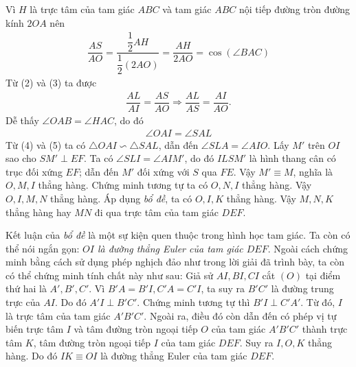 \begin{bt}
{\begin{center}
		\end{center}
		Vì $H$ là trực tâm của tam giác $ABC$ và tam giác $ABC$ nội tiếp đường tròn đường kính $2OA$ nên
		\begin{align*}
			\dfrac{AS}{AO}=\dfrac{\dfrac{1}{2}AH}{\dfrac{1}{2}(2AO)}=\dfrac{AH}{2AO}=\cos (\angle BAC)\tag{3}
		\end{align*}
		Từ (2) và (3) ta được
		\begin{align*}
			\dfrac{AL}{AI}=\dfrac{AS}{AO}\Rightarrow\dfrac{AL}{AS}=\dfrac{AI}{AO}.\tag{4}
		\end{align*}
		Dễ thấy $\angle OAB=\angle HAC$, do đó
		\begin{align*}
			\angle OAI=\angle SAL\tag{5}
		\end{align*}
		Từ (4) và (5) ta có $\triangle OAI\backsim \triangle SAL$, dẫn đến $\angle SLA=\angle AIO$.
		Lấy $M'$ trên $OI$ sao cho $SM'\perp EF$. Ta có $\angle SLI=\angle AIM'$, do đó $ILSM'$ là hình thang cân có trục đối xứng $EF$; dẫn đến $M'$ đối xứng với $S$ qua $FE$. Vậy $M'\equiv M$, nghĩa là $O,M,I$ thẳng hàng. Chứng minh tương tự ta có $O,N,I$ thẳng hàng. Vậy $O,I,M,N$ thẳng hàng.
		Áp dụng \textit{bổ đề}, ta có $O,I,K$ thẳng hàng. Vậy $M,N,K$ thẳng hàng hay $MN$ đi qua trực tâm của tam giác $DEF$.
		\begin{nx}
			Kết luận của \textit{bổ đề} là một sự kiện quen thuộc trong hình học tam giác. Ta còn có thể nói ngắn gọn: \textit{$OI$ là đường thẳng Euler của tam giác $DEF$}. Ngoài cách chứng minh bằng cách sử dụng phép nghịch đảo như trong lời giải đã trình bày, ta còn có thể chứng minh tính chất này như sau:
			Giả sử $AI,BI,CI$ cắt $(O)$ tại điểm thứ hai là $A',B',C'$. Vì $B'A=B'I,C'A=C'I$, ta suy ra $B'C'$ là đường trung trực của $AI$. Do đó $A'I\perp B'C'$. Chứng minh tương tự thì $B'I\perp C'A'$. Từ đó, $I$ là trực tâm của tam giác $A'B'C'$. Ngoài ra, điều đó còn dẫn đến có phép vị tự biến trực tâm $I$ và tâm đường tròn ngoại tiếp $O$ của tam giác $A'B'C'$ thành trực tâm $K$, tâm đường tròn ngoại tiếp $I$ của tam giác $DEF$. Suy ra $I,O,K$ thẳng hàng. Do đó $IK\equiv OI$ là đường thẳng Euler của tam giác $DEF$.
		\end{nx}
	}
\end{bt}

